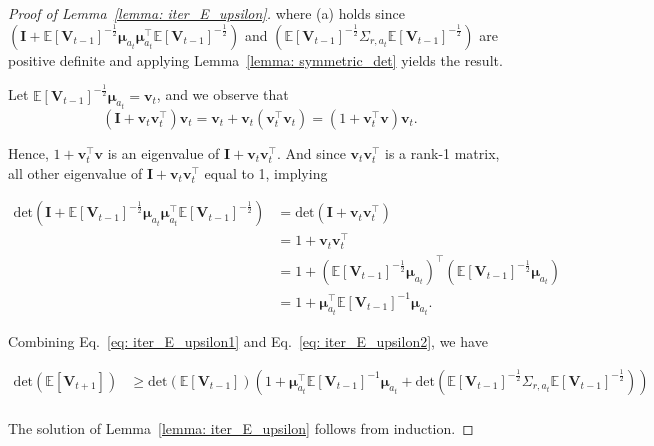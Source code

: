 \begin{proof}[Proof of Lemma~\ref{lemma: iter_E_upsilon}]
where (a) holds since $\left( 
\boldsymbol{I} + \mathbb{E}[\boldsymbol{V}_{t-1}]^{-\frac{1}{2}} \boldsymbol{\mu}_{a_t} \boldsymbol{\mu}_{a_t}^{\top} \mathbb{E}[\boldsymbol{V}_{t-1}]^{-\frac{1}{2}}
\right)$ and $\left( 
\mathbb{E}[\boldsymbol{V}_{t-1}]^{-\frac{1}{2}}  \Sigma_{r,a_t} \mathbb{E}[\boldsymbol{V}_{t-1}]^{-\frac{1}{2}}
\right)$ are positive definite and applying Lemma~\ref{lemma: symmetric_det} yields the result.

Let $\mathbb{E}[\boldsymbol{V}_{t-1}]^{-\frac{1}{2}} \boldsymbol{\mu}_{a_t} = \boldsymbol{v}_t$, and we observe that 
\[
\left( \boldsymbol{I} + \boldsymbol{v}_t \boldsymbol{v}_t^{\top} \right) \boldsymbol{v}_t
=
\boldsymbol{v}_t + \boldsymbol{v}_t \left( \boldsymbol{v}_t^{\top} \boldsymbol{v}_t \right)
=
\left(1 + \boldsymbol{v}_t^{\top} \boldsymbol{v} \right) \boldsymbol{v}_t.
\]

Hence, $1 + \boldsymbol{v}_t^{\top} \boldsymbol{v}$ is an eigenvalue of $\boldsymbol{I} + \boldsymbol{v}_t \boldsymbol{v}_t^{\top}$. And since $\boldsymbol{v}_t \boldsymbol{v}_t^{\top}$ is a rank-1 matrix, all other eigenvalue of $\boldsymbol{I} + \boldsymbol{v}_t \boldsymbol{v}_t^{\top}$ equal to 1, implying

\begin{equation}
\begin{aligned}
\label{eq: iter_E_upsilon2}
\text{det} \left( 
\boldsymbol{I} + \mathbb{E}[\boldsymbol{V}_{t-1}]^{-\frac{1}{2}} \boldsymbol{\mu}_{a_t} \boldsymbol{\mu}_{a_t}^{\top} \mathbb{E}[\boldsymbol{V}_{t-1}]^{-\frac{1}{2}}
\right) 
& =
\text{det} \left( \boldsymbol{I} + \boldsymbol{v}_t \boldsymbol{v}_t^{\top} \right)\\
& =
1 + \boldsymbol{v}_t \boldsymbol{v}_t^{\top} \\
& =
1 + \left( \mathbb{E}[\boldsymbol{V}_{t-1}]^{-\frac{1}{2}} \boldsymbol{\mu}_{a_t} \right)^{\top} \left( \mathbb{E}[\boldsymbol{V}_{t-1}]^{-\frac{1}{2}} \boldsymbol{\mu}_{a_t} \right) \\
& = 
1 + \boldsymbol{\mu}_{a_t}^{\top} \mathbb{E}[\boldsymbol{V}_{t-1}]^{-1} \boldsymbol{\mu}_{a_t}.
\end{aligned}
\end{equation}

Combining Eq.~\ref{eq: iter_E_upsilon1} and Eq.~\ref{eq: iter_E_upsilon2}, we have

\[
\begin{aligned}
\text{det} \left( \mathbb{E}[\boldsymbol{V}_{t+1}] \right)
& \geq
\text{det} \left( 
\mathbb{E}[\boldsymbol{V}_{t-1}] \right) 
\left(
1 + \boldsymbol{\mu}_{a_t}^{\top} \mathbb{E}[\boldsymbol{V}_{t-1}]^{-1} \boldsymbol{\mu}_{a_t}
+ \text{det} \left( 
\mathbb{E}[\boldsymbol{V}_{t-1}]^{-\frac{1}{2}}  \Sigma_{r,a_t} \mathbb{E}[\boldsymbol{V}_{t-1}]^{-\frac{1}{2}}
\right)
\right) \\
\end{aligned}
\]

The solution of Lemma~\ref{lemma: iter_E_upsilon} follows from induction.
\end{proof}


